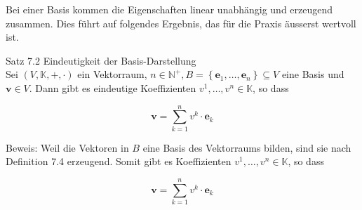 \documentclass[10pt]{article}
\begin{document}
Bei einer Basis kommen die Eigenschaften linear unabhängig und erzeugend zusammen. Dies führt auf folgendes Ergebnis, das für die Praxis äusserst wertvoll ist.

Satz 7.2 Eindeutigkeit der Basis-Darstellung\\
Sei $(V, \mathbb{K},+, \cdot)$ ein Vektorraum, $n \in \mathbb{N}^{+}, B=\left\{\mathbf{e}_{1}, \ldots, \mathbf{e}_{n}\right\} \subseteq V$ eine Basis und $\mathbf{v} \in V$. Dann gibt es eindeutige Koeffizienten $v^{1}, \ldots, v^{n} \in \mathbb{K}$, so dass


\begin{equation*}
\mathbf{v}=\sum_{k=1}^{n} v^{k} \cdot \mathbf{e}_{k} \tag{7.16}
\end{equation*}


Beweis: Weil die Vektoren in $B$ eine Basis des Vektorraums bilden, sind sie nach Definition 7.4 erzeugend. Somit gibt es Koeffizienten $v^{1}, \ldots, v^{n} \in \mathbb{K}$, so dass


\begin{equation*}
\mathbf{v}=\sum_{k=1}^{n} v^{k} \cdot \mathbf{e}_{k} \tag{7.17}
\end{equation*}
\end{document}
